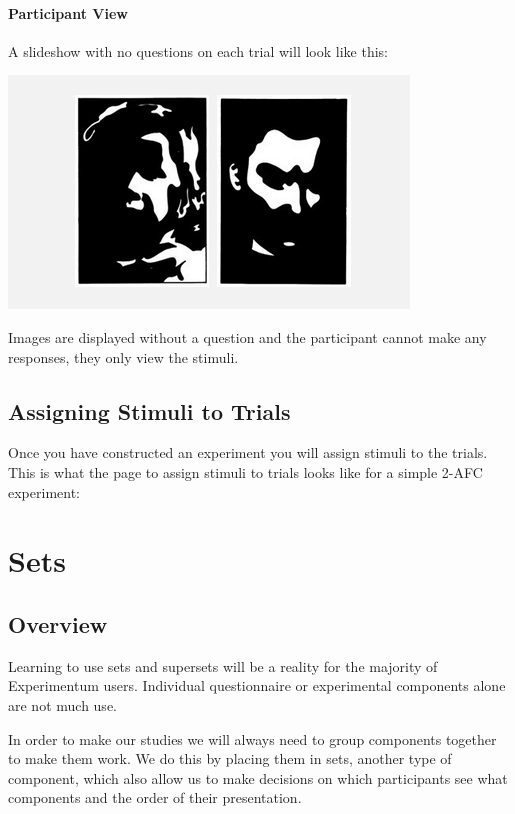 \documentclass[]{book}
\begin{document}
\subsubsection*{Participant View}\label{participant-view-6}

A slideshow with no questions on each trial will look like this:

\includegraphics{images/screenshots/view_slideshow.png}

Images are displayed without a question and the participant cannot make
any responses, they only view the stimuli.

\hypertarget{assignstimexp}{\section{Assigning Stimuli to
Trials}\label{assignstimexp}}

Once you have constructed an experiment you will assign stimuli to the
trials. This is what the page to assign stimuli to trials looks like for
a simple 2-AFC experiment:

\hypertarget{sets}{\chapter{Sets}\label{sets}}

\section{Overview}\label{overview-5}

Learning to use sets and supersets will be a reality for the majority of
Experimentum users. Individual questionnaire or experimental components
alone are not much use.

In order to make our studies we will always need to group components
together to make them work. We do this by placing them in sets, another
type of component, which also allow us to make decisions on which
participants see what components and the order of their presentation.
\end{document}
